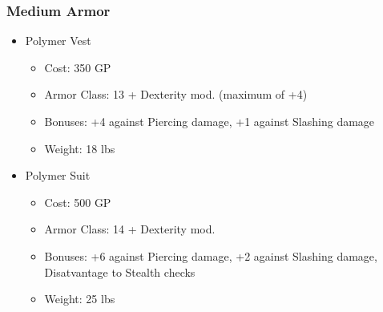 \documentclass[12pt, landscape]{article}
\begin{document}
\begin{FlushLeft}
\begin{multicols}{2}
			\subsubsection{Medium Armor}
			\begin{itemize}
				\item Polymer Vest
				\begin{itemize}
					\item Cost: 350 GP
					\item Armor Class: 13 + Dexterity mod. (maximum of +4)
					\item Bonuses: +4 against Piercing damage, +1 against Slashing damage
					\item Weight: 18 lbs
				\end{itemize}
				\item Polymer Suit
				\begin{itemize}
					\item Cost: 500 GP
					\item Armor Class: 14 + Dexterity mod.
					\item Bonuses: +6 against Piercing damage, +2 against Slashing damage, Disatvantage to Stealth checks
					\item Weight: 25 lbs
				\end{itemize}
			\end{itemize}
			\vfill


\end{multicols}
\end{FlushLeft}
\end{document}
